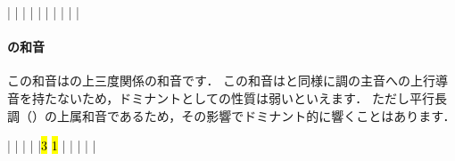 \documentclass[dvipdfmx,uplatex,b5paper,openany,jbase=12Q,nomag*,textwidth-limit=44%
               ]{gachimuchi}[2020/05/05]
\begin{document}
\begin{floatMusic}[pos=ht]
  \Startpiece%
  \znotes|\en
  \NOTes
  |%
  \en\bar
  \NOTEs
  |%
  \en\doublebar
  \NOTEs
  |%
  \en\bar
  \NOTEs
  |%
  \en\doublebar
  \NOTes
  |%
  \en\bar
  \NOTes
  \Mryaku\sk%
  |%
  \Mryaku\sk
  \en\setdoublebar
  \endpiece%
\end{floatMusic}


\paragraph{\bFlat\Gnvii の和音}
この和音は\Gnv\Min の上三度関係の和音です．
この和音は\Gnv\Min と同様に調の主音への上行導音を持たないため，ドミナントとしての性質は弱いといえます．
ただし平行長調（）の上属和音であるため，その影響でドミナント的に響くことはあります．

\begin{floatMusic}[pos=ht]
  \Startpiece%
  \znotes|\en
  \NOTes
  |%
  \en\bar
  \NOTEs
  |%
  \en\doublebar
  \NOTes
  |\hl{3}%
  \hl{1}%
  \en\bar
  \NOTEs
  |%
  \en\doublebar
  \NOTes
  |%
  \en\bar
  \NOTEs
  |%
  \en\setdoublebar
  \endpiece%
\end{floatMusic}
\end{document}
